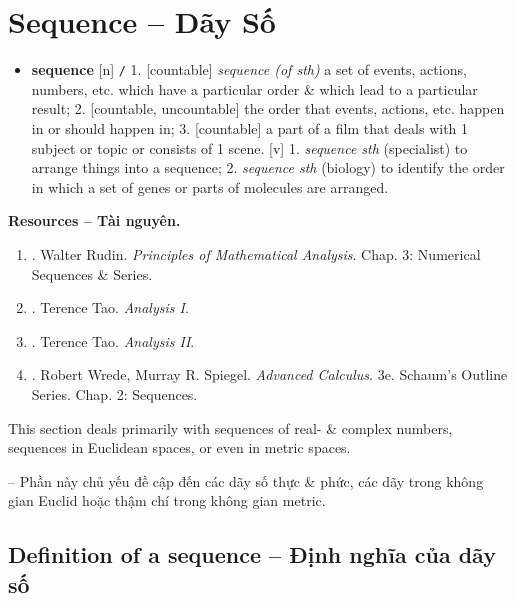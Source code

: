 \documentclass{article}
\begin{document}
\section{Sequence -- Dãy Số}
\begin{itemize}\sf\small
	\item \textbf{sequence} [n] {\tt/} 1. [countable] \textit{sequence (of sth)} a set of events, actions, numbers, etc. which have a particular order \& which lead to a particular result; 2. [countable, uncountable] the order that events, actions, etc. happen in or should happen in; 3. [countable] a part of a film that deals with 1 subject or topic or consists of 1 scene. [v] 1. \textit{sequence sth} (specialist) to arrange things into a sequence; 2. \textit{sequence sth} (biology) to identify the order in which a set of genes or parts of molecules are arranged.
\end{itemize}
\textbf{\textsf{Resources -- Tài nguyên.}}
\begin{enumerate}
	\item \cite{Rudin1976}. {\sc Walter Rudin}. {\it Principles of Mathematical Analysis}. Chap. 3: Numerical Sequences \& Series.
	
	\item \cite{Tao_analysis_1}. {\sc Terence Tao}. {\it Analysis I}.
	
	\item \cite{Tao_analysis_2}. {\sc Terence Tao}. {\it Analysis II}.
	
	\item \cite{Wrede_Spiegel2010}. {\sc Robert Wrede, Murray R. Spiegel}. {\it Advanced Calculus}. 3e. Schaum's Outline Series. Chap. 2: Sequences.
\end{enumerate}
This section deals primarily with sequences of real- \& complex numbers, sequences in Euclidean spaces, or even in metric spaces.

-- Phần này chủ yếu đề cập đến các dãy số thực \& phức, các dãy trong không gian Euclid hoặc thậm chí trong không gian metric.


\subsection{Definition of a sequence -- Định nghĩa của dãy số}
\end{document}
